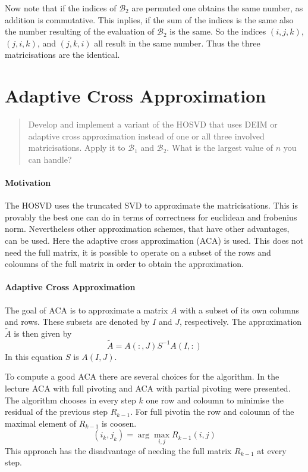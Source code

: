 \documentclass[%
a4paper,
parskip=half,
DIV=calc,
]
{scrartcl}
\begin{document}
Now note that if the indices of $\mathcal{B}_2$ are permuted one
obtains the same number, as addition is commutative.  This inplies, if
the sum of the indices is the same also the number resulting of the
evaluation of $\mathcal{B}_2$ is the same.  So the indices
$(i, j, k)$, $(j, i, k)$, and $(j, k, i)$ all result in the same
number.  Thus the three matricisations are the identical.

\section{Adaptive Cross Approximation}
\label{sec:aca}
\begin{quotation}
  \noindent
  Develop and implement a variant of the HOSVD that uses DEIM or
  adaptive cross approximation instead of one or all three involved
  matricisations. Apply it to $\mathcal{B}_1$ and
  $\mathcal{B}_2$. What is the largest value of $n$ you can handle?
\end{quotation}

\paragraph{Motivation}
The HOSVD uses the truncated SVD to approximate the
matricisations. This is provably the best one can do in terms of
correctness for euclidean and frobenius norm.  Nevertheless other
approximation schemes, that have other advantages, can be used.  Here
the adaptive cross approximation (ACA) is used.  This does not need
the full matrix, it is possible to operate on a subset of the rows and
coloumns of the full matrix in order to obtain the approximation.

\paragraph{Adaptive Cross Approximation}
The goal of ACA is to approximate a matrix $A$ with a subset of its
own columns and rows. These subsets are denoted by $I$ and $J$,
respectively.  The approximation $\tilde{A}$ is then given by
\begin{equation*}
  \tilde{A} = A(:,J) S^{-1} A(I,:)
\end{equation*}
In this equation $S$ is $A(I,J)$.

To compute a good ACA there are several choices for the algorithm.  In
the lecture ACA with full pivoting and ACA with partial pivoting were
presented.  The algorithm chooses in every step $k$ one row and
coloumn to minimise the residual of the previous step $R_{k-1}$.  For
full pivotin the row and coloumn of the maximal element of $R_{k-1}$
is coosen.
\begin{equation*}
  (i_k, j_k) = \arg\max_{i,j} R_{k-1}(i, j)
\end{equation*}
This approach has the disadvantage of needing the full matrix
$R_{k-1}$ at every step.
\end{document}
